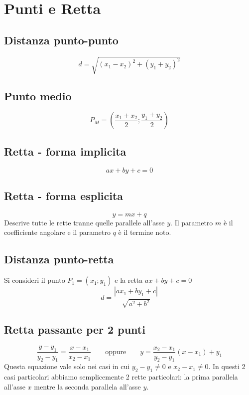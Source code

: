 \documentclass{article}
\begin{document}
  \section{Punti e Retta}

  \subsection*{Distanza punto-punto}
  \begin{equation}
    d = \sqrt{(x_1 - x_2)^2 + (y_1 + y_2)^2}
  \end{equation}

  \subsection*{Punto medio}
  \begin{equation}
    P_M = \left(\frac{x_1 + x_2}{2}; \frac{y_1 + y_2}{2}\right)
  \end{equation}

  \subsection*{Retta - forma implicita}
  \begin{equation}
    ax+by+c = 0
  \end{equation}

  \subsection*{Retta - forma esplicita}
  \begin{equation}
    y = mx + q
  \end{equation} 
  Descrive tutte le rette tranne quelle parallele all'asse $y$. Il parametro $m$ è il coefficiente angolare e il parametro $q$ è il termine noto.

  \subsection*{Distanza punto-retta}
  Si consideri il punto $P_1=(x_1;y_1)$ e la retta $ax+by+c=0$
  \begin{equation}
    d = \frac{|ax_1 +by_1 + c|}{\sqrt{a^2+b^2}}
  \end{equation}

  \subsection*{Retta passante per 2 punti}
  \begin{equation}
    \frac{y-y_1}{y_2-y_1} = \frac{x-x_1}{x_2-x_1}
    \qquad\text{oppure}\qquad
    y = \frac{x_2-x_1}{y_2-y_1}(x-x_1) + y_1
  \end{equation}
  Questa equazione vale solo nei casi in cui $y_2-y_1 \ne 0$ e $x_2-x_1 \ne 0$. In questi 2 casi particolari abbiamo semplicemente 2 rette particolari: la prima parallela all'asse $x$ mentre la seconda parallela all'asse $y$.
\end{document}
